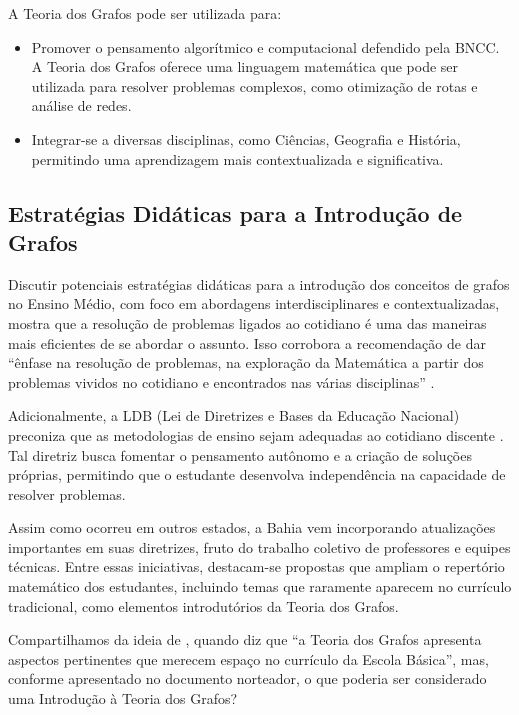 \documentclass[
  12pt,
  oneside,
  a4paper,
  english,
  brazilian
  ]{abntex2}
\theoremstyle{definition}
\begin{document}
A Teoria dos Grafos pode ser utilizada para:

\begin{itemize}
    \item Promover o pensamento algorítmico e computacional defendido pela BNCC. A Teoria dos Grafos oferece uma linguagem matemática que pode ser utilizada para resolver problemas complexos, como otimização de rotas e análise de redes.
    \item Integrar-se a diversas disciplinas, como Ciências, Geografia e História, permitindo uma aprendizagem mais contextualizada e significativa.
\end{itemize}

\subsection{Estratégias Didáticas para a Introdução de Grafos}

Discutir potenciais estratégias didáticas para a introdução dos conceitos de grafos no Ensino Médio, com foco em abordagens interdisciplinares e contextualizadas, mostra que a resolução de problemas ligados ao cotidiano é uma das maneiras mais eficientes de se abordar o assunto. Isso corrobora a recomendação de dar ``ênfase na resolução de problemas, na exploração da Matemática a partir dos problemas vividos no cotidiano e encontrados nas várias disciplinas'' \cite{brasil2002}.

Adicionalmente, a LDB (Lei de Diretrizes e Bases da Educação Nacional) preconiza que as metodologias de ensino sejam adequadas ao cotidiano discente \cite{brasil1996}. Tal diretriz busca fomentar o pensamento autônomo e a criação de soluções próprias, permitindo que o estudante desenvolva independência na capacidade de resolver problemas.

Assim como ocorreu em outros estados, a Bahia vem incorporando atualizações importantes em suas diretrizes, fruto do trabalho coletivo de professores e equipes técnicas. Entre essas iniciativas, destacam-se propostas que ampliam o repertório matemático dos estudantes, incluindo temas que raramente aparecem no currículo tradicional, como elementos introdutórios da Teoria dos Grafos.

Compartilhamos da ideia de , quando diz que ``a Teoria dos Grafos apresenta aspectos pertinentes que merecem espaço no currículo da Escola Básica'', mas, conforme apresentado no documento norteador, o que poderia ser considerado uma Introdução à Teoria dos Grafos?
\end{document}
